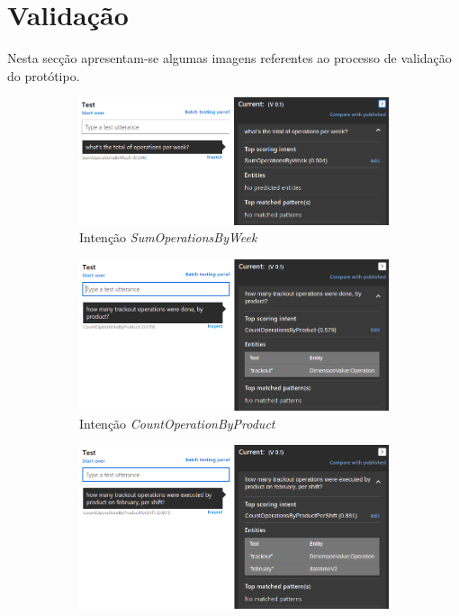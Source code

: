 \clearpage

\section{Validação}
Nesta secção apresentam-se algumas imagens referentes ao processo de validação do protótipo.

\begin{figure}[!ht]
\centering
    \begin{subfigure}{.48\textwidth}
        \centering
        \includegraphics[width=\textwidth]{appendices/assets/nlcomprehension01.png}
        \caption{Intenção \textit{SumOperationsByWeek}}
     \end{subfigure}
     \begin{subfigure}{.48\textwidth}
         \centering
        \includegraphics[width=\textwidth]{appendices/assets/nlcomprehension02.png}
        \caption{Intenção \textit{CountOperationByProduct}}
     \end{subfigure}
     \bigbreak
     \begin{subfigure}{.48\textwidth}
        \centering
        \includegraphics[width=\textwidth]{appendices/assets/nlcomprehension03.png}

\end{subfigure}
\end{figure}

